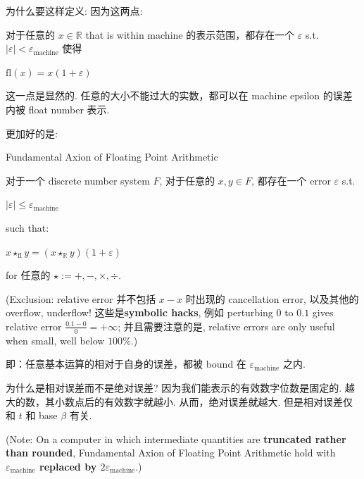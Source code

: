 为什么要这样定义: 因为这两点:

\begin{proposition}

对于任意的 \(x \in \mathbb{R}\) that is within machine 的表示范围，都存在一个 \(\varepsilon\) s.t. \(|\varepsilon| < \varepsilon_{\text{machine}}\) 使得

\(\text{fl}(x) = x\left( {1 + \varepsilon} \right)\)

\end{proposition}

这一点是显然的. 任意的大小不能过大的实数，都可以在 machine epsilon 的误差内被 float number 表示.

更加好的是:

\begin{theorem}{Fundamental Axion of Floating Point Arithmetic}

对于一个 discrete number system \(F\), 对于任意的 \(x,y \in F\), 都存在一个 error \(\varepsilon\) s.t.

\(|\varepsilon| \leq \varepsilon_{\text{machine}}\)

such that:

\(x \star_{\text{fl}}y = \left( {x \star_{\mathbb{R}}y} \right)\left( {1 + \varepsilon} \right)\)

for 任意的 \(\star := + , - , \times , \div\).

(Exclusion: relative error 并不包括 \(x - x\) 时出现的 cancellation error, 以及其他的 overflow, underflow! 这些是\textbf{symbolic hacks}, 例如 perturbing \(0\) to \(0.1\) gives relative error \(\frac{0.1 - 0}{0} = + \infty\); 并且需要注意的是, relative errors are only useful when small, well below \(100\%\).)

\end{theorem}

即：任意基本运算的相对于自身的误差，都被 bound 在 \(\varepsilon_{\text{machine}}\) 之内.

为什么是相对误差而不是绝对误差? 因为我们能表示的有效数字位数是固定的. 越大的数，其小数点后的有效数字就越小. 从而，绝对误差就越大. 但是相对误差仅和 \(t\) 和 base \(\beta\) 有关.

(Note: On a computer in which intermediate quantities are \textbf{truncated rather than rounded}, Fundamental Axion of Floating Point Arithmetic hold with\textbf{\(\varepsilon_{\text{machine}}\) replaced by \(2\varepsilon_{\text{machine}}\)}.)

